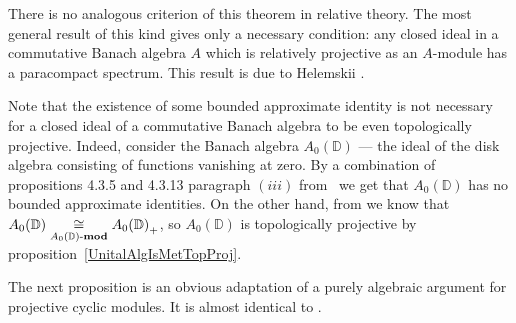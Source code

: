 There is no analogous criterion of this theorem in relative theory. The most
general result of this kind gives only a necessary condition: any closed ideal in a
commutative Banach algebra $A$ which is relatively projective as an $A$-module has
a paracompact spectrum. This result is due to Helemskii
\cite[theorem IV.3.6]{HelHomolBanTopAlg}. 

Note that the existence of some bounded approximate identity is not necessary 
for a closed ideal of a commutative Banach algebra to be even 
topologically projective. Indeed, consider the Banach algebra  
$A_0(\mathbb{D})$ --- the ideal of the disk algebra consisting of functions 
vanishing at zero. By a combination of propositions 4.3.5 and 4.3.13 
paragraph $(iii)$ from~\cite{DalBanAlgAutCont} we get that $A_0(\mathbb{D})$ 
has no bounded approximate identities. On the other hand, 
from \cite[example IV.2.2]{HelBanLocConvAlg} we know that
$A_0(\mathbb{D})\mathrel{\mathop{\cong}\limits_{A_0(\mathbb{D})\text{-}\mathbf{mod}}} {A_0(\mathbb{D})}_+$, so
$A_0(\mathbb{D})$ is topologically projective by
proposition~\ref{UnitalAlgIsMetTopProj}.

The next proposition is an obvious adaptation of a purely algebraic argument for
projective cyclic modules. It is almost identical to \cite[proposition 2.11]{WhiteInjmoduAlg}.

